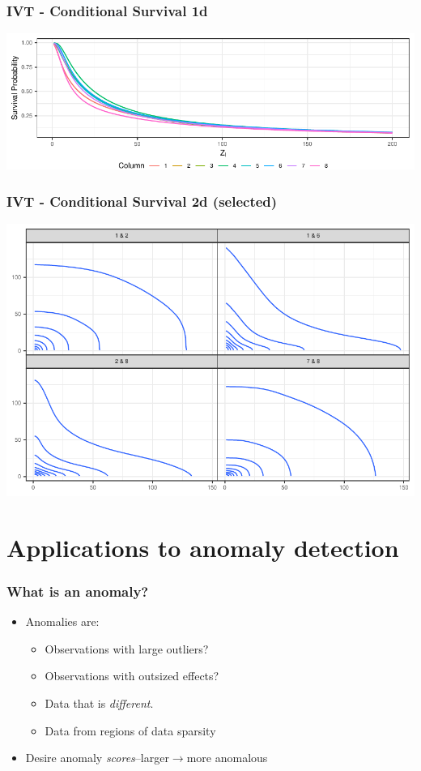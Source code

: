 \documentclass[aspectratio=169]{beamer}
\newlength{\frametextheight}
\begin{document}
\begin{frame}
  \frametitle{IVT - Conditional Survival 1d}
  \begin{center}
    \includegraphics[height=\frametextheight,width=\textwidth]{./images/condsurv_1d}
  \end{center}
\end{frame}

\begin{frame}
  \frametitle{IVT - Conditional Survival 2d (selected)}
  \begin{center}
    \includegraphics[height=\frametextheight,width=\frametextheight]{./images/condsurv_2d}
  \end{center}
\end{frame}

\section[Anomaly]{Applications to anomaly detection}

\begin{frame}
  \frametitle{What is an anomaly?}
  \begin{itemize}
    \item Anomalies are:
      \begin{itemize}
        \item Observations with large outliers?
        \item Observations with outsized effects?
        \item Data that is \emph{different}.
        \item Data from regions of data sparsity
      \end{itemize}
    \item Desire anomaly \emph{scores}--larger$\rightarrow$more anomalous
  \end{itemize}
\end{frame}
\end{document}
